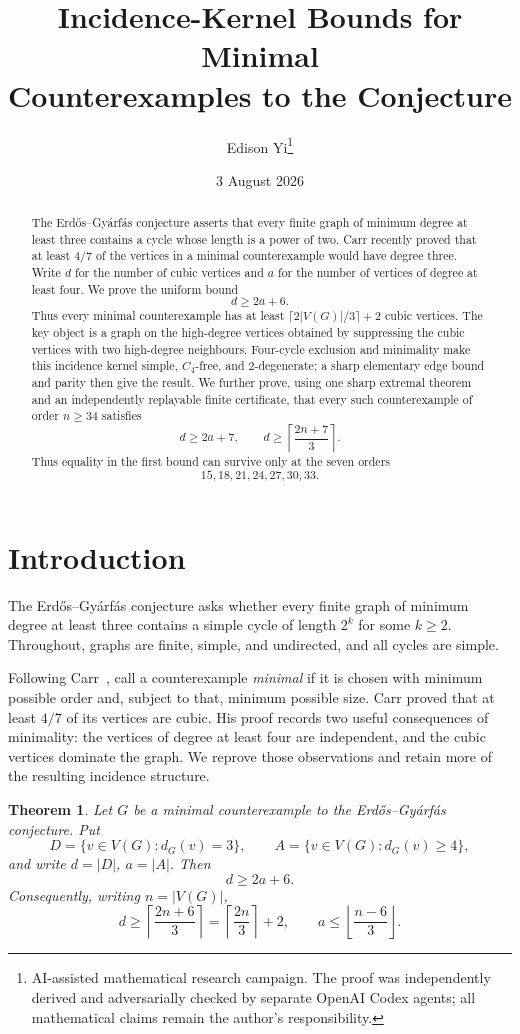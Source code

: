 \documentclass[11pt]{article}
\title{Incidence-Kernel Bounds for Minimal\\
Counterexamples to the \EG{} Conjecture}
\author{Edison Yi\thanks{AI-assisted mathematical research campaign.  The
proof was independently derived and adversarially checked by separate
OpenAI Codex agents; all mathematical claims remain the author's
responsibility.}}
\date{3 August 2026}
\newtheorem{theorem}{Theorem}
\newcommand{\EG}{Erd\H{o}s--Gy\'arf\'as}
\begin{document}
\maketitle

\begin{abstract}
The \EG{} conjecture asserts that every finite graph of minimum degree at
least three contains a cycle whose length is a power of two.  Carr recently
proved that at least $4/7$ of the vertices in a minimal counterexample would
have degree three.  Write $d$ for the number of cubic vertices and $a$ for
the number of vertices of degree at least four.  We prove the uniform bound
\[
 d\ge 2a+6.
\]
Thus every minimal counterexample has at least
$\lceil2|V(G)|/3\rceil+2$ cubic vertices.  The
key object is a graph on the high-degree vertices obtained by suppressing
the cubic vertices with two high-degree neighbours.  Four-cycle exclusion
and minimality make this incidence kernel simple, $C_4$-free, and
$2$-degenerate; a sharp elementary edge bound and parity then give the
result.  We further prove, using one sharp extremal theorem and an
independently replayable finite certificate, that every such counterexample
of order $n\ge34$ satisfies
\[
 d\ge 2a+7,
 \qquad
 d\ge\left\lceil\frac{2n+7}{3}\right\rceil.
\]
Thus equality in the first bound can survive only at the seven orders
\[
15,18,21,24,27,30,33.
\]
\end{abstract}

\section{Introduction}

The \EG{} conjecture asks whether every finite graph of minimum degree at
least three contains a simple cycle of length $2^k$ for some $k\ge2$.
Throughout, graphs are finite, simple, and undirected, and all cycles are
simple.

Following Carr~\cite{Carr2026}, call a counterexample \emph{minimal} if it is
chosen with minimum possible order and, subject to that, minimum possible
size.  Carr proved that at least $4/7$ of its vertices are cubic.  His proof
records two useful consequences of minimality: the vertices of degree at
least four are independent, and the cubic vertices dominate the graph.  We
reprove those observations and retain more of the resulting incidence
structure.

\begin{theorem}\label{thm:main}
Let $G$ be a minimal counterexample to the \EG{} conjecture.  Put
\[
 D=\{v\in V(G):d_G(v)=3\},\qquad
 A=\{v\in V(G):d_G(v)\ge4\},
\]
and write $d=|D|$, $a=|A|$.  Then
\[
 d\ge 2a+6.
\]
Consequently, writing $n=|V(G)|$,
\[
 d\ge \left\lceil\frac{2n+6}{3}\right\rceil
   =\left\lceil\frac{2n}{3}\right\rceil+2,
 \qquad
 a\le \left\lfloor\frac{n-6}{3}\right\rfloor.
\]
\end{theorem}
\end{document}
